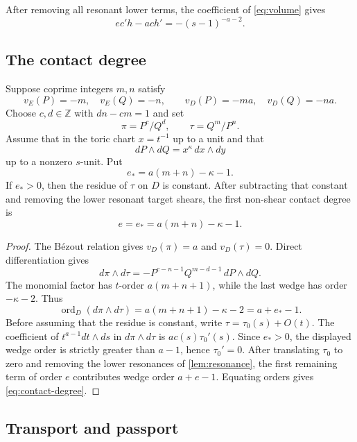 \documentclass[11pt,reqno]{amsart}
\begin{document}
After removing all resonant lower terms, the coefficient of
\eqref{eq:volume} gives
\begin{equation}
\label{eq:transport-equation}
ec'h-ach'=-(s-1)^{-a-2}.
\end{equation}

\subsection{The contact degree}

\begin{proposition}
\label{prop:contact}
Suppose coprime integers \(m,n\) satisfy
\[
v_E(P)=-m,\quad v_E(Q)=-n,\qquad
v_D(P)=-ma,\quad v_D(Q)=-na.
\]
Choose \(c,d\in\mathbb Z\) with \(dn-cm=1\) and set
\[
\pi=P^c/Q^d,\qquad \tau=Q^m/P^n.
\]
Assume that in the toric chart \(x=t^{-1}\) up to a unit and that
\[
dP\wedge dQ=x^\kappa\,dx\wedge dy
\]
up to a nonzero \(s\)-unit.  Put
\[
e_*=a(m+n)-\kappa-1.
\]
If \(e_*>0\), then the residue of \(\tau\) on \(D\) is constant.  After
subtracting that constant and removing the lower resonant target shears, the
first non-shear contact degree is
\begin{equation}
\label{eq:contact-degree}
e=e_*=a(m+n)-\kappa-1.
\end{equation}
\end{proposition}

\begin{proof}
The Bézout relation gives \(v_D(\pi)=a\) and \(v_D(\tau)=0\).  Direct
differentiation gives
\[
d\pi\wedge d\tau
=-P^{c-n-1}Q^{m-d-1}\,dP\wedge dQ.
\]
The monomial factor has \(t\)-order \(a(m+n+1)\), while the last wedge has
order \(-\kappa-2\).  Thus
\[
\operatorname{ord}_D(d\pi\wedge d\tau)
=a(m+n+1)-\kappa-2=a+e_*-1.
\]
Before assuming that the residue is constant, write
\(\tau=\tau_0(s)+O(t)\).  The coefficient of
\(t^{a-1}dt\wedge ds\) in \(d\pi\wedge d\tau\) is
\(a c(s)\tau_0'(s)\).  Since \(e_*>0\), the displayed wedge order is
strictly greater than \(a-1\), hence \(\tau_0'=0\).  After translating
\(\tau_0\) to zero and removing the lower resonances of
\cref{lem:resonance}, the first remaining term of order \(e\) contributes
wedge order \(a+e-1\).  Equating orders gives
\eqref{eq:contact-degree}.
\end{proof}

\subsection{Transport and passport}
\end{document}
